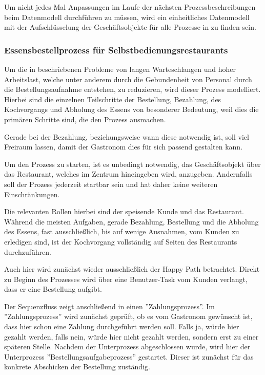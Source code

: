 Um nicht jedes Mal Anpassungen im Laufe der nächsten Prozessbeschreibungen beim Datenmodell durchführen zu müssen, wird ein einheitliches Datenmodell mit der Aufschlüsselung der Geschäftsobjekte für alle Prozesse in  zu finden sein.

\subsubsection{Essensbestellprozess für Selbstbedienungsrestaurants}
\label{sec:selbstbedienungsrestaurantunterprozess}
Um die in  beschriebenen Probleme von langen Warteschlangen und hoher Arbeitslast, welche unter anderem durch die Gebundenheit von Personal durch die Bestellungsaufnahme entstehen, zu reduzieren, wird dieser Prozess modelliert. Hierbei sind die einzelnen Teilschritte der Bestellung, Bezahlung, des Kochvorgangs und Abholung des Essens von besonderer Bedeutung, weil dies die primären Schritte sind, die den Prozess ausmachen.

Gerade bei der Bezahlung, beziehungsweise wann diese notwendig ist, soll viel Freiraum lassen, damit der Gastronom dies für sich passend gestalten kann.

Um den Prozess zu starten, ist es unbedingt notwendig, das Geschäftsobjekt über das Restaurant, welches im Zentrum hineingeben wird, anzugeben. Andernfalls soll der Prozess jederzeit startbar sein und hat daher keine weiteren Einschränkungen.

Die relevanten Rollen hierbei sind der speisende Kunde und das Restaurant.
Während die meisten Aufgaben, gerade Bezahlung, Bestellung und die Abholung des Essens, fast ausschließlich, bis auf wenige Ausnahmen, vom Kunden zu erledigen sind, ist der Kochvorgang vollständig auf Seiten des Restaurants durchzuführen.


Auch hier wird zunächst wieder ausschließlich der Happy Path betrachtet. Direkt zu Beginn des Prozesses wird über eine Benutzer-Task vom Kunden verlangt, dass er eine Bestellung aufgibt.

Der Sequenzfluss zeigt anschließend in einen ''Zahlungsprozess''. Im ''Zahlungsprozess'' wird zunächst geprüft, ob es vom Gastronom gewünscht ist, dass hier schon eine Zahlung durchgeführt werden soll. Falls ja, würde hier gezahlt werden, falls nein, würde hier nicht gezahlt werden, sondern erst zu einer späteren Stelle. Nachdem der Unterprozess abgeschlossen wurde, wird hier der Unterprozess ''Bestellungsaufgabeprozess'' gestartet. Dieser ist zunächst für das konkrete Abschicken der Bestellung zuständig.

